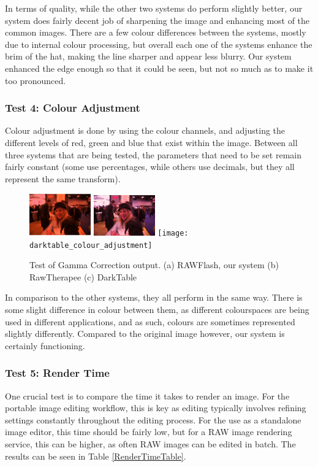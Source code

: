 \documentclass[10pt,a4paper]{article}
\begin{document}
In terms of quality, while the other two systems do perform slightly better, our system does fairly decent job of sharpening
the image and enhancing most of the common images. There are a few colour differences between the systems, mostly due to internal
colour processing, but overall each one of the systems enhance the brim of the hat, making the line sharper and appear less blurry. 
Our system enhanced the edge enough so that it could be seen, but not so much as to make it too pronounced.

\subsubsection{Test 4: Colour Adjustment}
Colour adjustment is done by using the colour channels, and adjusting the different levels of red, green and blue that exist within the image.
Between all three systems that are being tested, the parameters that need to be set remain fairly constant (some use percentages, while others use decimals,
but they all represent the same transform).

\begin{figure}\label{colouradjustmentcomparison}
    \centering
    \subfigure
    {
        \includegraphics[width=100px]{rawflash_colour_adjustment}
    }
    \subfigure
    {
        \includegraphics[width=100px]{rawtherapee_colour_adjustment}
    }
    \subfigure
    {
        \texttt{[image: darktable\_colour\_adjustment]}
    }
    \caption{
        Test of Gamma Correction output. 
        (a) RAWFlash, our system
        (b) RawTherapee
        (c) DarkTable
    }
 \end{figure}
In comparison to the other systems, they all perform in the same way. There is some slight difference in colour between them, as different colourspaces
are being used in different applications, and as such, colours are sometimes represented slightly differently. Compared to the original image however, our
system is certainly functioning.

\subsubsection{Test 5: Render Time}
One crucial test is to compare the time it takes to render an image. For the portable image editing workflow, this is key as editing typically involves
refining settings constantly throughout the editing process. For the use as a standalone image editor, this time should be fairly low, but for a RAW
image rendering service, this can be higher, as often RAW images can be edited in batch. The results can be seen in Table \ref{RenderTimeTable}.
\end{document}
